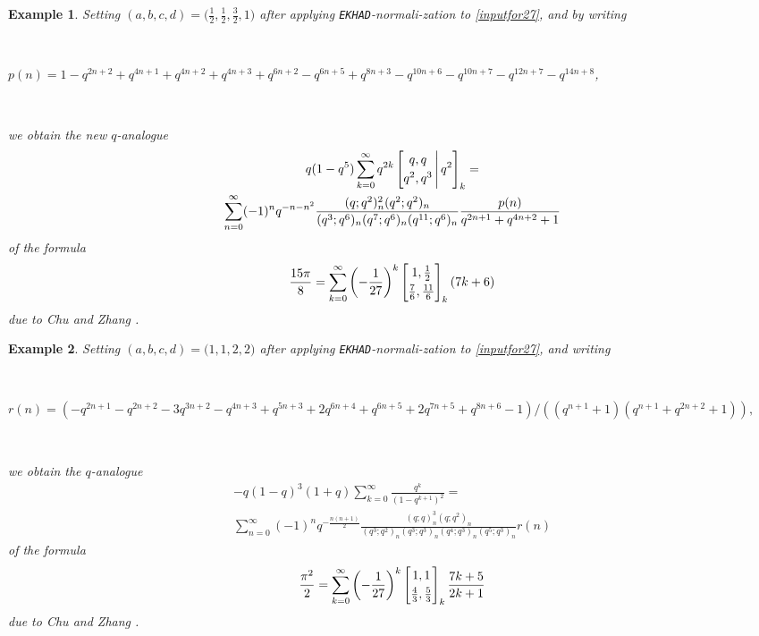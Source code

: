\documentclass[12pt]{article}
\newtheorem{example}{Example}
\begin{document}
\begin{example}
 Setting $(a, b, c, d) = \big( \frac{1}{2}, \frac{1}{2}, \frac{3}{2}, 1 \big)$ 
 after applying {\tt EKHAD}-normali-zation to \eqref{inputfor27}, 
 and by writing

 \ 

\noindent $p(n) = 1-q^{2 n+2}+q^{4 n+1}+q^{4 n+2}+q^{4 n+3}+q^{6 n+2}-q^{6 n+5}+q^{8 n+3}-q^{10 n+6}-q^{10 n+7}-q^{12 n+7}-q^{14 n+8}$, 

 \ 

\noindent we obtain the new $q$-analogue
\begin{multline*} 
 q(1-q^5) \sum_{k=0}^{\infty} 
 q^{2k} \left[ \begin{matrix} 
 q, q \vspace{1mm} \\ 
 q^2, q^3 \end{matrix} \, \Bigg| \, q^2 \right]_{k} = \\ 
 \sum_{n=0}^{\infty} (-1)^n q^{-n-n^2} 
 \frac{ (q;q^2)_{n}^{2} (q^2;q^2)_{n} }{ (q^3;q^6)_{n} (q^7;q^6)_{n} (q^{11};q^6)_{n} } 
 \frac{p(n)}{q^{2 n+1}+q^{4
 n+2}+1} 
\end{multline*}
 of the formula 
 $$ \frac{15 \pi}{8} = \sum_{k=0}^{\infty} 
 \left( -\frac{1}{27} \right)^{k} \left[ \begin{matrix} 
 1, \frac{1}{2} \vspace{1mm} \\ 
 \frac{7}{6}, \frac{11}{6} \end{matrix} \right]_{k} (7k+6) $$
 due to Chu and Zhang \cite[Example 27]{ChuZhang2014}. 
\end{example}

\begin{example}
 Setting $(a, b, c, d) = \big( 1, 1, 2, 2 \big)$ after applying {\tt EKHAD}-normali-zation to \eqref{inputfor27}, 
 and writing 
 
 \ 

\noindent $ r(n) = (-q^{2 n+1}-q^{2 n+2}-3 q^{3 n+2}-q^{4 n+3}+q^{5 n+3}+2 q^{6 n+4}+q^{6 n+5}+2 q^{7 n+5}+q^{8 n+6} - 
 1) / (\left(q^{n+1}+1\right)
 \left(q^{n+1}+q^{2 n+2}+1\right)), $ 

 \ 

\noindent we obtain the $q$-analogue
\begin{multline*}
 -q(1-q)^{3} (1+q) \sum_{k=0}^{\infty} \frac{q^{k}}{(1-q^{k+1})^{2}} = \\ 
 \sum_{n=0}^{\infty} (-1)^{n} q^{-\frac{n(n+1)}{2}}
 \frac{ \left( q;q \right)_{n}^{3} \left( q;q^2 \right)_{n} }{ 
 \left( q^{3};q^{2} \right)_{n} \left( q^{3};q^{3} \right)_{n} \left( q^{4};q^{3} \right)_{n} 
 \left( q^{5};q^{3} \right)_{n} } r(n)
\end{multline*}
 of the formula 
 $$ \frac{\pi^2}{2} = \sum_{k=0}^{\infty} 
 \left( -\frac{1}{27} \right)^{k} \left[ \begin{matrix} 
 1, 1 \vspace{1mm} \\ 
 \frac{4}{3}, \frac{5}{3} \end{matrix} \right]_{k} \frac{7k+5}{2k+1} $$
 due to Chu and Zhang \cite[Example 25]{ChuZhang2014}. 
\end{example}
\end{document}
